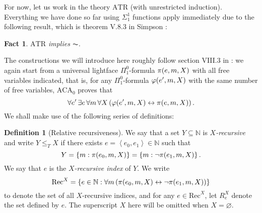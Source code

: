 \documentclass[11pt]{article}
\theoremstyle{plain}
\newtheorem*{fact*}{Fact}
\theoremstyle{definition}
\newtheorem*{definition}{Definition}
\newcommand{\tuple}[1]{\left\langle #1 \right\rangle}
\newcommand{\Rec}{\mathrm{Rec}}
\begin{document}
For now, let us work in the theory $\mathrm{ATR}$ (with unrestricted induction). Everything we have done so far using $\Sigma^1_1$ functions apply immediately due to the following result, which is theorem V.8.3 in Simpson \cite{simpson09-soa}:

\begin{fact*}
    $\mathrm{ATR}$ implies $\AC$.
\end{fact*}

The constructions we will introduce here roughly follow section VIII.3 in \cite{simpson09-soa}: we again start from a universal lightface $\Pi^0_1$-formula $\pi\mleft(e, m, X\mright)$ with all free variables indicated, that is, for any $\Pi^0_1$-formula $\varphi\mleft(e', m, X\mright)$ with the same number of free variables, $\mathrm{ACA}_0$ proves that
\[\forall e' \, \exists e \, \forall m \, \forall X \left(\varphi\mleft(e', m, X\mright) \leftrightarrow \pi\mleft(e, m, X\mright)\right).\]
We shall make use of the following series of definitions:

\begin{definition}[Relative recursiveness]
    We say that a set $Y \subseteq \mathbb{N}$ is \emph{$X$-recursive} and write $Y \leq_T X$ if there exists $e = \tuple{e_0, e_1} \in \mathbb{N}$ such that
    \[Y = \left\{m : \pi\mleft(e_0, m, X\mright)\right\} = \left\{m : \neg \pi\mleft(e_1, m, X\mright)\right\}.\]
    We say that $e$ is the \emph{$X$-recursive index} of $Y$. We write
    \[\Rec^X = \left\{e \in \mathbb{N} : \forall m \left(\pi\mleft(e_0, m, X\mright) \leftrightarrow \neg \pi\mleft(e_1, m, X\mright)\right)\right\}\]
    to denote the set of all $X$-recursive indices, and for any $e \in \Rec^X$, let $R^X_e$ denote the set defined by $e$. The superscript $X$ here will be omitted when $X = \varnothing$.
\end{definition}
\end{document}
